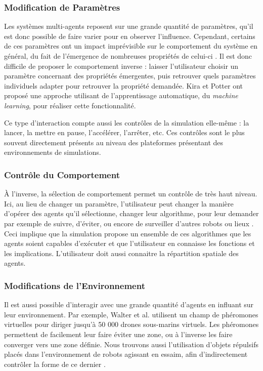 		
	\subsubsection{Modification de Paramètres}
	Les systèmes multi-agents reposent sur une grande quantité de paramètres, qu'il est donc possible de faire varier pour en observer l'influence. Cependant, certains de ces paramètres ont un impact imprévisible sur le comportement du système en général, du fait de l'émergence de nombreuses propriétés de celui-ci \cite{couzin_collective_2002}. Il est donc difficile de proposer le comportement inverse : laisser l'utilisateur choisir un paramètre concernant des propriétés émergentes, puis retrouver quels paramètres individuels adapter pour retrouver la propriété demandée. Kira et Potter \cite{kira_exerting_2009} ont proposé une approche utilisant de l'apprentissage automatique, du \textit{machine learning}, pour réaliser cette fonctionnalité.
	
	Ce type d'interaction compte aussi les contrôles de la simulation elle-même : la lancer, la mettre en pause, l'accélérer, l'arrêter, etc. Ces contrôles sont le plus souvent directement présents au niveau des plateformes présentant des environnements de simulations.
		
	\subsubsection{Contrôle du Comportement}
	À l'inverse, la sélection de comportement permet un contrôle de très haut niveau. Ici, au lieu de changer un paramètre, l'utilisateur peut changer la manière d'opérer des agents qu'il sélectionne, changer leur algorithme, pour leur demander par exemple de suivre, d'éviter, ou encore de surveiller d'autres robots ou lieux \cite{coppin_controlling_2012}. Ceci implique que la simulation propose un ensemble de ces algorithmes que les agents soient capables d'exécuter et que l'utilisateur en connaisse les fonctions et les implications. L'utilisateur doit aussi connaitre la répartition spatiale des agents.
	
		
		
	\subsubsection{Modifications de l'Environnement}
		Il est aussi possible d'interagir avec une grande quantité d'agents en influant sur leur environnement. Par exemple, Walter et al. \cite{walter_uav_2006} utilisent un champ de phéromones virtuelles pour diriger jusqu'à 50 000 drones sous-marins virtuels. Les phéromones permettent de facilement leur faire éviter une zone, ou à l'inverse les faire converger vers une zone définie. Nous trouvons aussi l'utilisation d'objets répulsifs placés dans l'environnement de robots agissant en essaim, afin d'indirectement contrôler la forme de ce dernier \cite{jung_multi-robot_2013}.	
	
